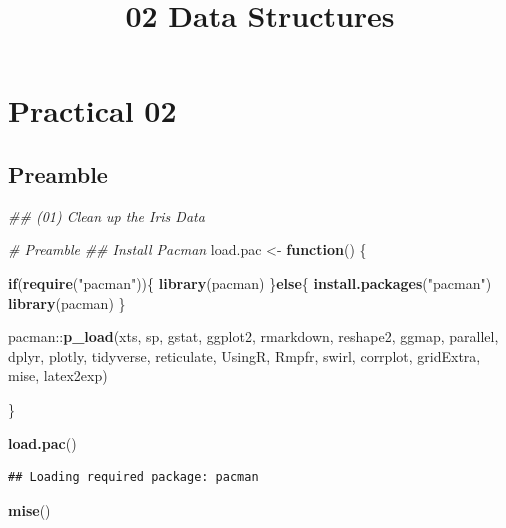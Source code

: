 \documentclass[]{article}
\title{02 Data Structures}
\author{}
\date{}
\newenvironment{Shaded}{}{}
\newcommand{\CommentTok}[1]{\textcolor[rgb]{0.38,0.63,0.69}{\textit{#1}}}
\newcommand{\ControlFlowTok}[1]{\textcolor[rgb]{0.00,0.44,0.13}{\textbf{#1}}}
\newcommand{\KeywordTok}[1]{\textcolor[rgb]{0.00,0.44,0.13}{\textbf{#1}}}
\newcommand{\NormalTok}[1]{#1}
\newcommand{\OperatorTok}[1]{\textcolor[rgb]{0.40,0.40,0.40}{#1}}
\newcommand{\StringTok}[1]{\textcolor[rgb]{0.25,0.44,0.63}{#1}}
\begin{document}
\maketitle

{
\setcounter{tocdepth}{2}
\tableofcontents
}
\hypertarget{practical-02}{%
\section{Practical 02}\label{practical-02}}

\hypertarget{preamble}{%
\subsection{Preamble}\label{preamble}}

\begin{Shaded}
\begin{Highlighting}[]
\CommentTok{## (01) Clean up the Iris Data}

\CommentTok{# Preamble}
\CommentTok{## Install Pacman}
\NormalTok{load.pac <-}\StringTok{ }\ControlFlowTok{function}\NormalTok{() \{}
  
  \ControlFlowTok{if}\NormalTok{(}\KeywordTok{require}\NormalTok{(}\StringTok{"pacman"}\NormalTok{))\{}
    \KeywordTok{library}\NormalTok{(pacman)}
\NormalTok{  \}}\ControlFlowTok{else}\NormalTok{\{}
    \KeywordTok{install.packages}\NormalTok{(}\StringTok{"pacman"}\NormalTok{)}
    \KeywordTok{library}\NormalTok{(pacman)}
\NormalTok{  \}}
  
\NormalTok{  pacman}\OperatorTok{::}\KeywordTok{p_load}\NormalTok{(xts, sp, gstat, ggplot2, rmarkdown, reshape2, ggmap,}
\NormalTok{                 parallel, dplyr, plotly, tidyverse, reticulate, UsingR, Rmpfr,}
\NormalTok{                 swirl, corrplot, gridExtra, mise, latex2exp)}
  
\NormalTok{\}}

\KeywordTok{load.pac}\NormalTok{()}
\end{Highlighting}
\end{Shaded}

\begin{verbatim}
## Loading required package: pacman
\end{verbatim}

\begin{Shaded}
\begin{Highlighting}[]
\KeywordTok{mise}\NormalTok{()}
\end{Highlighting}
\end{Shaded}
\end{document}
